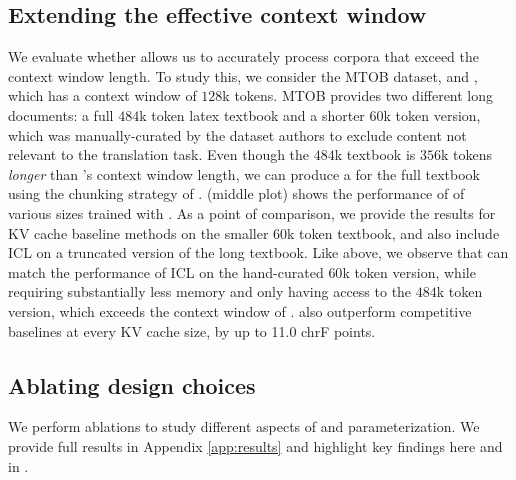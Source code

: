\subsection{Extending the effective context window}
\label{sec:results-extending}
We evaluate whether \method allows us to accurately process corpora that exceed the context window length.
To study this, we consider the MTOB dataset, and \llamaeightb, which has a context window of $128$k tokens.
MTOB provides two different long documents: a full $484$k token latex textbook and a shorter $60$k token version, which was manually-curated by the dataset authors to exclude content not relevant to the translation task.
Even though the $484$k textbook is $356$k tokens \textit{longer} than \llamaeightb's context window length, we can produce a \artifact for the full textbook using the chunking strategy of \method.
 (middle plot) shows the performance of \artifacts of various sizes trained with \method.
As a point of comparison, we provide the results for KV cache baseline methods on the smaller $60$k token textbook, and also include ICL on a truncated version of the long textbook. Like above, we observe that \artifact can match the performance of ICL on the hand-curated $60$k token version, while requiring substantially less memory and only having access to the $484$k token version, which exceeds the context window of \llamaeightb.
\artifacts also outperform competitive baselines at every KV cache size, by up to 11.0 chrF points.
\vspace{-2mm}
\subsection{Ablating \method design choices}
\label{sec:results-ablations}
We perform ablations to study different aspects of \method and \artifact parameterization.
We provide full results in Appendix \ref{app:results} and highlight key findings here and in .
